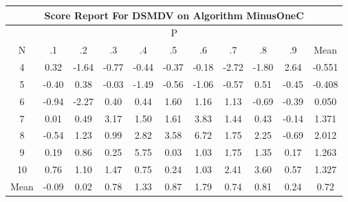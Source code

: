 \documentclass[11pt,a4paper]{report}
\begin{document}
\begin{longtable}{ | c || c | c | c | c | c | c | c | c | c || c |}
\hline
\multicolumn{11}{|c|}{ Score Report For DSMDV on Algorithm MinusOneC} \\
\hline
\multicolumn{11}{|c|}{ P } \\
\hline
N & .1 & .2 & .3 & .4 & .5 & .6 & .7 & .8 & .9 & Mean\\
 \hline
 \hline
 \endhead
  4 &  \cellcolor[HTML]{F7F7FF} 0.32 &  \cellcolor[HTML]{FFD7D7} -1.64 &  \cellcolor[HTML]{FFEFEF} -0.77 &  \cellcolor[HTML]{FFF7F7} -0.44 &  \cellcolor[HTML]{FFF7F7} -0.37 &  \cellcolor[HTML]{FFF7F7} -0.18 &  \cellcolor[HTML]{FFB7B7} -2.72 &  \cellcolor[HTML]{FFCFCF} -1.80 &  \cellcolor[HTML]{BFBFFF} 2.64 & -0.551 \\
  5 &  \cellcolor[HTML]{FFF7F7} -0.40 &  \cellcolor[HTML]{F7F7FF} 0.38 &  \cellcolor[HTML]{FFFFFF} -0.03 &  \cellcolor[HTML]{FFD7D7} -1.49 &  \cellcolor[HTML]{FFEFEF} -0.56 &  \cellcolor[HTML]{FFE7E7} -1.06 &  \cellcolor[HTML]{FFEFEF} -0.57 &  \cellcolor[HTML]{EFEFFF} 0.51 &  \cellcolor[HTML]{FFF7F7} -0.45 & -0.408 \\
  6 &  \cellcolor[HTML]{FFE7E7} -0.94 &  \cellcolor[HTML]{FFC7C7} -2.27 &  \cellcolor[HTML]{F7F7FF} 0.40 &  \cellcolor[HTML]{F7F7FF} 0.44 &  \cellcolor[HTML]{D7D7FF} 1.60 &  \cellcolor[HTML]{DFDFFF} 1.16 &  \cellcolor[HTML]{DFDFFF} 1.13 &  \cellcolor[HTML]{FFEFEF} -0.69 &  \cellcolor[HTML]{FFF7F7} -0.39 & 0.050 \\
  7 &  \cellcolor[HTML]{FFFFFF} 0.01 &  \cellcolor[HTML]{EFEFFF} 0.49 &  \cellcolor[HTML]{AFAFFF} 3.17 &  \cellcolor[HTML]{D7D7FF} 1.50 &  \cellcolor[HTML]{D7D7FF} 1.61 &  \cellcolor[HTML]{9F9FFF} 3.83 &  \cellcolor[HTML]{D7D7FF} 1.44 &  \cellcolor[HTML]{F7F7FF} 0.43 &  \cellcolor[HTML]{FFFFFF} -0.14 & 1.371 \\
  8 &  \cellcolor[HTML]{FFEFEF} -0.54 &  \cellcolor[HTML]{DFDFFF} 1.23 &  \cellcolor[HTML]{E7E7FF} 0.99 &  \cellcolor[HTML]{B7B7FF} 2.82 &  \cellcolor[HTML]{A7A7FF} 3.58 &  \cellcolor[HTML]{5858FF} 6.72 &  \cellcolor[HTML]{CFCFFF} 1.75 &  \cellcolor[HTML]{C7C7FF} 2.25 &  \cellcolor[HTML]{FFEFEF} -0.69 & 2.012 \\
  9 &  \cellcolor[HTML]{F7F7FF} 0.19 &  \cellcolor[HTML]{E7E7FF} 0.86 &  \cellcolor[HTML]{F7F7FF} 0.25 &  \cellcolor[HTML]{7070FF} 5.75 &  \cellcolor[HTML]{FFFFFF} 0.03 &  \cellcolor[HTML]{E7E7FF} 1.03 &  \cellcolor[HTML]{CFCFFF} 1.75 &  \cellcolor[HTML]{DFDFFF} 1.35 &  \cellcolor[HTML]{F7F7FF} 0.17 & 1.263 \\
  10 &  \cellcolor[HTML]{EFEFFF} 0.76 &  \cellcolor[HTML]{E7E7FF} 1.10 &  \cellcolor[HTML]{D7D7FF} 1.47 &  \cellcolor[HTML]{EFEFFF} 0.75 &  \cellcolor[HTML]{F7F7FF} 0.24 &  \cellcolor[HTML]{E7E7FF} 1.03 &  \cellcolor[HTML]{BFBFFF} 2.41 &  \cellcolor[HTML]{A7A7FF} 3.60 &  \cellcolor[HTML]{EFEFFF} 0.57 & 1.327 \\
 \hline
 \hline
Mean &  \cellcolor[HTML]{FFFFFF} -0.09 &  \cellcolor[HTML]{FFFFFF} 0.02 &  \cellcolor[HTML]{EFEFFF} 0.78 &  \cellcolor[HTML]{DFDFFF} 1.33 &  \cellcolor[HTML]{E7E7FF} 0.87 &  \cellcolor[HTML]{CFCFFF} 1.79 &  \cellcolor[HTML]{EFEFFF} 0.74 &  \cellcolor[HTML]{E7E7FF} 0.81 &  \cellcolor[HTML]{F7F7FF} 0.24 &  \cellcolor[HTML]{EFEFFF} 0.72
\end{longtable}
\end{document}
